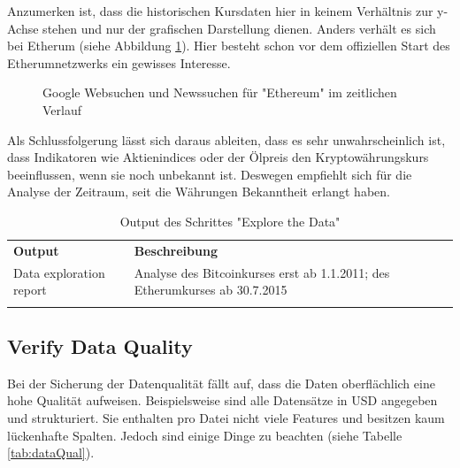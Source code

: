 Anzumerken ist, dass die historischen Kursdaten hier in keinem Verhältnis zur y-Achse stehen und nur der grafischen Darstellung dienen.
Anders verhält es sich bei Etherum (siehe Abbildung \ref{fig:PublicInterestETH}). Hier besteht schon vor dem offiziellen Start des Etherumnetzwerks\citep{tual_ethereum_2015} ein gewisses Interesse.
\begin{figure}[H]
\caption{Google Websuchen und Newssuchen für "Ethereum" im zeitlichen Verlauf}
\label{fig:PublicInterestETH}
\centering
\end{figure}
Als Schlussfolgerung lässt sich daraus ableiten, dass es sehr unwahrscheinlich ist, dass Indikatoren wie Aktienindices oder der Ölpreis den Kryptowährungskurs beeinflussen, wenn sie noch unbekannt ist. Deswegen empfiehlt sich für die Analyse der Zeitraum, seit die Währungen Bekanntheit erlangt haben. 

\begin{longtable}[H]{|p{}|p{12cm}|}
\hline
\textbf{Output} & \textbf{Beschreibung} \\ 
\hhline{==}
Data exploration report & Analyse des Bitcoinkurses erst ab 1.1.2011; des Etherumkurses ab 30.7.2015\\
\hline
\caption{Output des Schrittes "Explore the Data"}
\end{longtable}


\subsection{Verify Data Quality}
Bei der Sicherung der Datenqualität fällt auf, dass die Daten oberflächlich eine hohe Qualität aufweisen. Beispielsweise sind alle Datensätze in USD angegeben und strukturiert. Sie enthalten pro Datei nicht viele Features und besitzen kaum lückenhafte Spalten. Jedoch sind einige Dinge zu beachten (siehe Tabelle \ref{tab:dataQual}).

